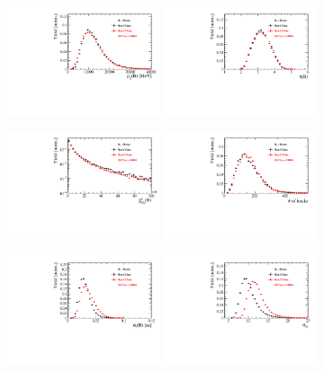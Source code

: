 \begin{figure}[h]
\centering
\includegraphics[height=!,width=0.4\textwidth]{figs/dataVsMC/run1vs2_norm/Ds2all_Bs_PT.pdf}
\includegraphics[height=!,width=0.4\textwidth]{figs/dataVsMC/run1vs2_norm/Ds2all_Bs_ETA.pdf}

\includegraphics[height=!,width=0.4\textwidth]{figs/dataVsMC/run1vs2_norm/Ds2all_Bs_FDCHI2_OWNPV.pdf}
\includegraphics[height=!,width=0.4\textwidth]{figs/dataVsMC/run1vs2_norm/Ds2all_NTracks.pdf}

\includegraphics[height=!,width=0.4\textwidth]{figs/dataVsMC/run1vs2_norm/Ds2all_Bs_DTF_TAUERR.pdf}
\includegraphics[height=!,width=0.4\textwidth]{figs/dataVsMC/run1vs2_norm/Ds2all_Bs_DTF_MERR.pdf}


\end{figure}
